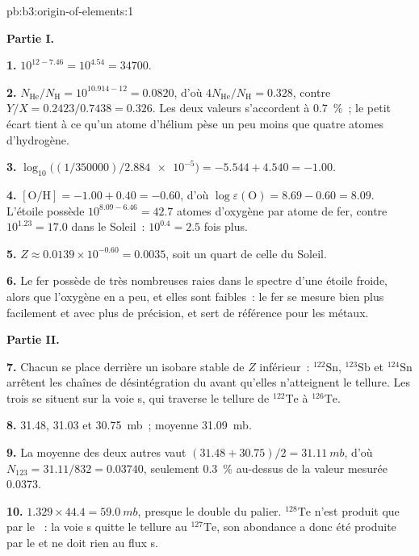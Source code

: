 \begin{solution}{pb:b3:origin-of-elements:1}

\textbf{Partie I.}

\textbf{1.} $10^{12 - 7.46} = 10^{4.54} = \num{34700}$.

\textbf{2.} $N_\mathrm{He}/N_\mathrm{H} = 10^{10.914 - 12} = \num{0.0820}$, d'où
$4N_\mathrm{He}/N_\mathrm{H} = \num{0.328}$, contre $Y/X =
0.2423/0.7438 = \num{0.326}$. Les deux valeurs s'accordent à \qty{0.7}{\percent}~; le
petit écart tient à ce qu'un atome d'hélium pèse un peu moins que quatre
atomes d'hydrogène.

\textbf{3.} $\log_{10}\bigl((1/350000)/\num{2.884e-5}\bigr) = -5.544 + 4.540 =
-1.00$.

\textbf{4.} $[\mathrm{O/H}] = -1.00 + 0.40 = -0.60$, d'où
$\log\varepsilon(\mathrm{O}) = 8.69 - 0.60 = 8.09$. L'étoile possède
$10^{8.09 - 6.46} = 42.7$ atomes d'oxygène par atome de fer, contre
$10^{1.23} = 17.0$ dans le Soleil~: $10^{0.4} = 2.5$ fois plus.

\textbf{5.} $Z \approx 0.0139\times10^{-0.60} = \num{0.0035}$, soit un quart de
celle du Soleil.

\textbf{6.} Le fer possède de très nombreuses raies dans le spectre d'une étoile froide, alors que
l'oxygène en a peu, et elles sont faibles~: le fer se mesure bien plus facilement et
avec plus de précision, et sert de référence pour les métaux.

\textbf{Partie II.}

\textbf{7.} Chacun se place derrière un isobare stable de $Z$ inférieur~:
$^{122}\mathrm{Sn}$, $^{123}\mathrm{Sb}$ et $^{124}\mathrm{Sn}$ arrêtent
les chaînes de désintégration du  avant qu'elles n'atteignent le tellure. Les trois se situent
sur la voie s, qui traverse le tellure de $^{122}\mathrm{Te}$ à
$^{126}\mathrm{Te}$.

\textbf{8.} \num{31.48}, \num{31.03} et \qty{30.75}{mb}~; moyenne
\qty{31.09}{mb}.

\textbf{9.} La moyenne des deux autres vaut $(31.48 + 30.75)/2 = \qty{31.11}{mb}$,
d'où $N_{123} = 31.11/832 = \num{0.03740}$, seulement \qty{0.3}{\percent}
au-dessus de la valeur mesurée \num{0.0373}.

\textbf{10.} $1.329\times44.4 = \qty{59.0}{mb}$, presque le double du palier.
$^{128}\mathrm{Te}$ n'est produit que par le ~: la voie s quitte le tellure au
$^{127}\mathrm{Te}$, son abondance a donc été produite par le  et
ne doit rien au flux s.


\end{solution}
